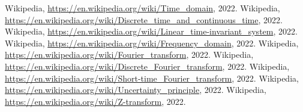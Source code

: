 \clearpage
{}
\begin{thebibliography}{9}
         Wikipedia, \underline{https://en.wikipedia.org/wiki/Time\_domain}, 2022.
         Wikipedia, \underline{https://en.wikipedia.org/wiki/Discrete\_time\_and\_continuous\_time}, 2022.
         Wikipedia, \underline{https://en.wikipedia.org/wiki/Linear\_time-invariant\_system}, 2022.
         Wikipedia, \underline{https://en.wikipedia.org/wiki/Frequency\_domain}, 2022.
         Wikipedia, \underline{https://en.wikipedia.org/wiki/Fourier\_transform}, 2022.
         Wikipedia, \underline{https://en.wikipedia.org/wiki/Discrete\_Fourier\_transform}, 2022.
         Wikipedia, \underline{https://en.wikipedia.org/wiki/Short-time\_Fourier\_transform}, 2022.
         Wikipedia, \underline{https://en.wikipedia.org/wiki/Uncertainty\_principle}, 2022.
         Wikipedia, \underline{https://en.wikipedia.org/wiki/Z-transform}, 2022.
\end{thebibliography}

